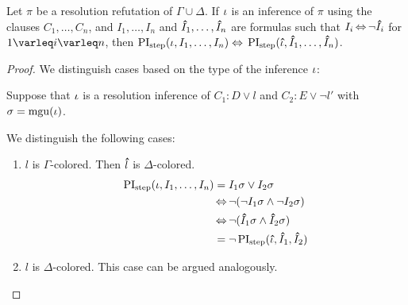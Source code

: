 \begin{lemma}
	\label{lemma:symmetry_step}
	Let $\pi$ be a resolution refutation of $\Gamma \cup \Delta$.
	If $\iota$ is an inference of $\pi$ using the clauses $C_1, \dots, C_n$,
	and
	$I_1, \dots, I_n$ and 
	$\bm\hat{I}_1, \dots, \bm\hat{I}_n$ are formulas  
	such that $I_i \operatorname{\Leftrightarrow} \lnot \bm\hat{I}_i$ for $1\varleq i \varleq n$, then
	$\operatorname{PI}_{\mathrm{step}}(\iota, I_1, \dots, I_n) \;{\operatorname{\Leftrightarrow}}\; \operatorname{PI}_{\mathrm{step}}(\bm\hat{\iota}, \bm\hat{I}_1, \dots, \bm\hat{I}_n)$.
\end{lemma}
\begin{proof}

	We distinguish cases based on the type of the inference $\iota$:

	\begin{indproof}
			\newcommand{\p}[1]{\primex{#1}}
			\nopagebreak

			Suppose that $\iota$ is a resolution inference of $C_1: D \lor l$ and $C_2: E \lor \lnot l'$ with $\sigma = \operatorname{mgu}(\iota)$.
			\nopagebreak

			We distinguish the following cases:
			\nopagebreak
			\begin{enumerate}
				\item $l$ is $\Gamma$-colored. Then $\bm\hat{l}$ is $\Delta$-colored.
					\begin{align*}
						\PIstep(\inference, I_1, \dots, I_n) &= I_1\sigma \lor I_2\sigma\\
													 &\semiff \lnot ( \lnot I_1\sigma \land \lnot I_2\sigma )\\
														&\semiff \lnot ( \p I_1\sigma \land \p I_2\sigma ) \\
														&= \lnot \PIstep(\primex \inference, \p I_1, \p I_2)  
					\end{align*}
				\item $l$ is $\Delta$-colored. This case can be argued analogously.


\end{enumerate}
\end{indproof}
\end{proof}
